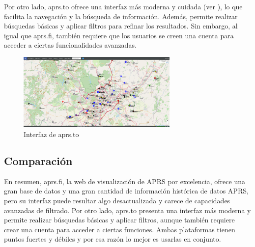 Por otro lado, aprs.to ofrece una interfaz más moderna y cuidada (ver ), lo que facilita la navegación y la búsqueda de información. Además, permite realizar búsquedas básicas y aplicar filtros para refinar los resultados. Sin embargo, al igual que aprs.fi, también requiere que los usuarios se creen una cuenta para acceder a ciertas funcionalidades avanzadas.

\begin{figure}[h]
    \centering
    \includegraphics[width=0.7\textwidth]{Imagenes/Chapter_2/aprs-to.png}
    \caption{Interfaz de aprs.to}
    \label{fig:aprs-to}
\end{figure}

\subsection{Comparación}

En resumen, aprs.fi, la web de visualización de APRS por excelencia, ofrece una gran base de datos y una gran cantidad de información histórica de datos APRS, pero su interfaz puede resultar algo desactualizada y carece de capacidades avanzadas de filtrado. Por otro lado, aprs.to presenta una interfaz más moderna y permite realizar búsquedas básicas y aplicar filtros, aunque también requiere crear una cuenta para acceder a ciertas funciones. Ambas plataformas tienen puntos fuertes y débiles y por esa razón lo mejor es usarlas en conjunto.
